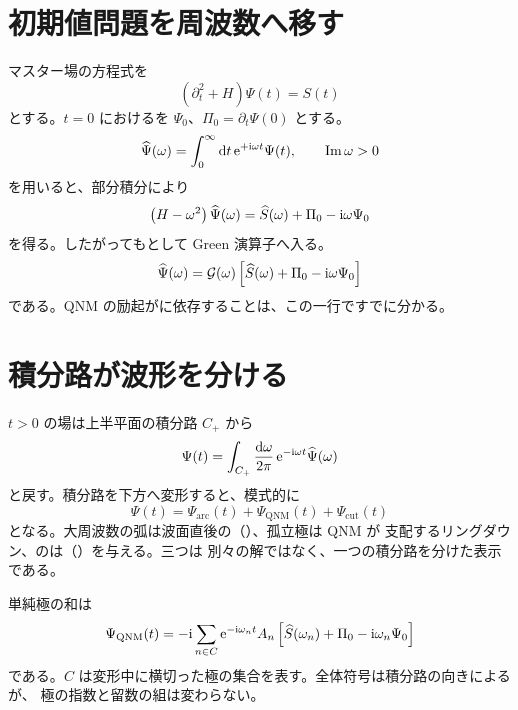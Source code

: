 \section{初期値問題を周波数へ移す}

マスター場の方程式を
\begin{equation}
\left(\partial_t^2+H\right)\Psi(t)
=
S(t)
\label{eq:time-response-wave}
\end{equation}
とする。$t=0$ におけるを $\Psi_0$、$\Pi_0=\partial_t\Psi(0)$ とする。
\begin{equation}
\widehat\Psi(\omega)
=
\int_0^\infty \mathrm{d} t\,
\mathrm{e}^{+\mathrm{i}\omega t}\Psi(t),
\qquad
\operatorname{Im}\omega>0
\label{eq:one-sided-transform}
\end{equation}
を用いると、部分積分により
\begin{equation}
\left(H-\omega^2\right)\widehat\Psi(\omega)
=
\widehat S(\omega)
+\Pi_0
-\mathrm{i}\omega\Psi_0
\label{eq:initial-data-source}
\end{equation}
を得る。したがってもとして Green 演算子へ入る。
\begin{equation}
\widehat\Psi(\omega)
=
\mathcal{G}(\omega)
\left[
\widehat S(\omega)+\Pi_0-\mathrm{i}\omega\Psi_0
\right]
\label{eq:initial-response-resolvent}
\end{equation}
である。QNM の励起がに依存することは、この一行ですでに分かる。

\section{積分路が波形を分ける}

$t>0$ の場は上半平面の積分路 $C_+$ から
\begin{equation}
\Psi(t)
=
\int_{C_+}
\frac{\mathrm{d}\omega}{2\pi}\,
\mathrm{e}^{-\mathrm{i}\omega t}
\widehat\Psi(\omega)
\label{eq:time-inverse-contour}
\end{equation}
と戻す。積分路を下方へ変形すると、模式的に
\begin{equation}
\Psi(t)
=
\Psi_{\mathrm{arc}}(t)
+\Psi_{\mathrm{QNM}}(t)
+\Psi_{\mathrm{cut}}(t)
\label{eq:prompt-ringdown-tail}
\end{equation}
となる。大周波数の弧は波面直後の（）、孤立極は QNM が
支配するリングダウン、のは（）を与える。三つは
別々の解ではなく、一つの積分路を分けた表示である\cite{Leaver:1986gd}。

単純極の和は
\begin{equation}
\Psi_{\mathrm{QNM}}(t)
=
-\mathrm{i}
\sum_{n\in C}
\mathrm{e}^{-\mathrm{i}\omega_n t}
A_n
\left[
\widehat S(\omega_n)+\Pi_0-\mathrm{i}\omega_n\Psi_0
\right]
\label{eq:qnm-time-sum}
\end{equation}
である。$C$ は変形中に横切った極の集合を表す。全体符号は積分路の向きによるが、
極の指数と留数の組は変わらない。

